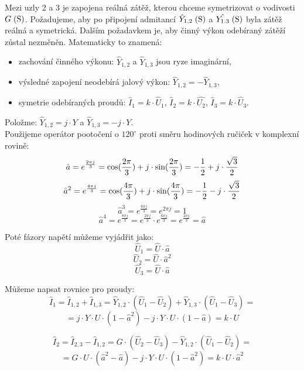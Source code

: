 \documentclass{article}
\begin{document}
Mezi uzly 2 a 3 je zapojena reálná zátěž, kterou chceme symetrizovat o vodivosti $G \; (\textrm{S}) $. Požadujeme, aby po připojení admitancí $\hat{Y}_{1,2} \; (\textrm{S})$ a $\hat{Y_{1.3}} \; (\textrm{S})$ byla zátěž reálná a symetrická. Dalším požadavkem je, aby činný výkon odebíraný zátěží zůstal nezměněn. Matematicky to znamená:

\begin{itemize}
    \item zachování činného výkonu: $\hat{Y}_{1,2}$ a $\hat{Y}_{1,3}$ jsou ryze imaginární,
    \item výsledné zapojení neodebírá jalový výkon: $\hat{Y}_{1,2} = - \hat{Y}_{1,3}$,
    \item symetrie odebíraných proudů: $\hat{I}_1 = k \cdot \hat{U}_1$, $\hat{I}_2 = k \cdot \hat{U_2}$, $\hat{I}_3 = k \cdot \hat{U}_3$.
\end{itemize}

Položme: $\hat{Y}_{1,2} = j \cdot Y$ a $\hat{Y}_{1,3} = -j \cdot Y$.\\

Použijeme operátor pootočení o $120^\circ$ proti směru hodinových ručiček v komplexní rovině:
$$
    \hat{a} = e^{\frac{2 \pi j}{3}} = \textrm{cos}(\frac{2 \pi}{3}) + j \cdot \textrm{sin}(\frac{2 \pi}{3}) = -\frac{1}{2} + j \cdot \frac{\sqrt{3}}{2}
$$
$$
    \hat{a}^2 = e^{\frac{4 \pi j}{3}} = \textrm{cos}(\frac{4 \pi}{3}) + j \cdot \textrm{sin}(\frac{4 \pi}{3}) = -\frac{1}{2} - j \cdot \frac{\sqrt{3}}{2}
$$
$$
    \hat{a}^3 = e^{\frac{6 \pi j}{3}} = e^{2 \pi j} = 1
$$
$$
    \hat{a}^4 = e^{\frac{8 \pi j}{3}} = e^{\frac{2 \pi j}{3}} \cdot e^{\frac{6 \pi j}{3}} = e^{\frac{2 \pi j}{3}} = \hat{a}
$$

Poté fázory napětí můžeme vyjádřit jako:
$$
    \hat{U}_1 = \hat{U} \cdot \hat{a}
$$
$$
    \hat{U}_2 = \hat{U} \cdot \hat{a}^2
$$
$$
    \hat{U}_3 = \hat{U} \cdot \hat{a}
$$

Můžeme napsat rovnice pro proudy:
$$
    \hat{I}_1 = \hat{I}_{1,2} + \hat{I}_{1,3} = \hat{Y}_{1,2} \cdot \left( \hat{U}_1 - \hat{U}_2 \right) + \hat{Y}_{1,3} \cdot \left( \hat{U}_1 - \hat{U}_3 \right) =
$$
$$
    = j \cdot Y \cdot U \cdot \left( 1 - \hat{a}^2 \right) - j \cdot Y \cdot U \cdot \left( 1 - \hat{a} \right) = k \cdot U
$$

$$
    \hat{I}_2 = \hat{I}_{2,3} - \hat{I}_{1,2} = G \cdot \left( \hat{U}_2 - \hat{U}_3 \right) - \hat{Y}_{1,2} \cdot \left( \hat{U}_1 - \hat{U}_2 \right) =
$$
$$
    = G \cdot U \cdot \left( \hat{a}^2 - \hat{a} \right) - j \cdot Y \cdot U \cdot \left( 1 - \hat{a}^2 \right) = k \cdot U \cdot \hat{a}^2
$$
\end{document}
